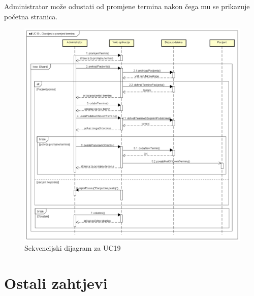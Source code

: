 				Administrator može odustati od promjene termina nakon čega mu se prikazuje početna stranica.
				
				\begin{figure}[H]
					\includegraphics[scale=0.4]{slike/UC19_Obavijest_o_promjeni_termina.PNG} %
					\centering
					\caption{Sekvencijski dijagram za UC19}
					\label{fig:sekvencijski_dijagram_4}
				\end{figure}
				\eject
	
		\section{Ostali zahtjevi}
			 
